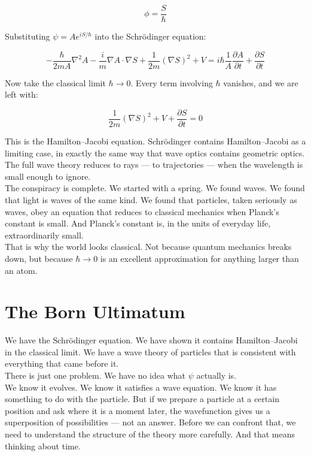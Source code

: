 \documentclass[krantz1,ChapterTOCs]{krantz}
\begin{document}
$$\phi = \frac{S}{\hbar}$$

Substituting $\psi = Ae^{iS/\hbar}$ into the Schr\"{o}dinger 
equation:

$$-\frac{\hbar}{2mA}\nabla^2 A
- \frac{i}{m}\nabla A \cdot \nabla S
+ \frac{1}{2m}(\nabla S)^2 + V
= i\hbar\frac{1}{A}\frac{\partial A}{\partial t} 
+ \frac{\partial S}{\partial t}$$

Now take the classical limit $\hbar \to 0$. Every term involving 
$\hbar$ vanishes, and we are left with:

$$\boxed{\frac{1}{2m}(\nabla S)^2 + V + 
\frac{\partial S}{\partial t} = 0}$$

This is the Hamilton--Jacobi equation. Schr\"{o}dinger contains 
Hamilton--Jacobi as a limiting case, in exactly the same way that 
wave optics contains geometric optics. The full wave theory reduces 
to rays --- to trajectories --- when the wavelength is small enough 
to ignore.\\

The conspiracy is complete. We started with a spring. We found waves. 
We found that light is waves of the same kind. We found that 
particles, taken seriously as waves, obey an equation that reduces 
to classical mechanics when Planck's constant is small. And Planck's 
constant is, in the units of everyday life, extraordinarily small.\\

That is why the world looks classical. Not because quantum mechanics 
breaks down, but because $\hbar \to 0$ is an excellent approximation 
for anything larger than an atom.\\

\part{The Born Ultimatum}

We have the Schr\"{o}dinger equation. We have shown it contains 
Hamilton--Jacobi in the classical limit. We have a wave theory of 
particles that is consistent with everything that came before it.\\

There is just one problem. We have no idea what $\psi$ actually is.\\

We know it evolves. We know it satisfies a wave equation. We know 
it has something to do with the particle. But if we prepare a 
particle at a certain position and ask where it is a moment later, 
the wavefunction gives us a superposition of possibilities --- not 
an answer. Before we can confront that, we need to understand the 
structure of the theory more carefully. And that means thinking 
about time.\\
\end{document}
